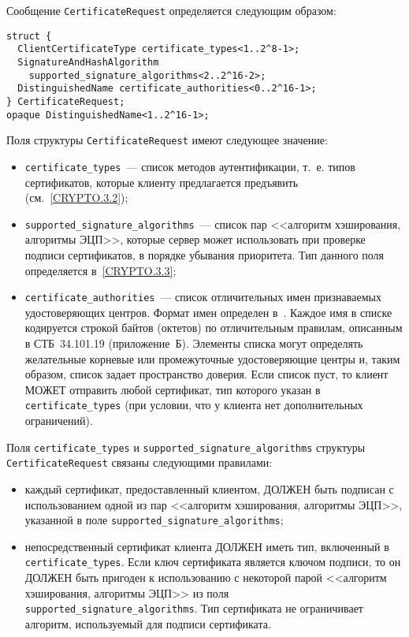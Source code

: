 Сообщение \lstinline{CertificateRequest} определяется следующим образом:
\begin{lstlisting}
struct {
  ClientCertificateType certificate_types<1..2^8-1>;
  SignatureAndHashAlgorithm
    supported_signature_algorithms<2..2^16-2>;
  DistinguishedName certificate_authorities<0..2^16-1>;
} CertificateRequest;
opaque DistinguishedName<1..2^16-1>;
\end{lstlisting}


Поля структуры \lstinline{CertificateRequest} имеют следующее значение:
\begin{itemize}
\item[--]
\lstinline{certificate_types}~--- 
список методов аутентификации, 
т.~е. типов сертификатов, которые клиенту предлагается предъявить 
(см.~\ref{CRYPTO.3.2}); 

\item[--]
\lstinline{supported_signature_algorithms}~--- список пар <<алгоритм 
хэширования, алгоритмы ЭЦП>>, которые сервер может использовать при проверке 
подписи сертификатов, в порядке убывания приоритета. Тип данного поля 
определяется в~\ref{CRYPTO.3.3};  

\item[--]
\lstinline{certificate_authorities}~--- список отличительных имен 
признаваемых удостоверяющих центров. Формат имен определен в~\cite{X501}. 
Каждое имя в списке кодируется строкой байтов (октетов) по отличительным 
правилам, описанным в СТБ~34.101.19 (приложение~Б). 
Элементы списка могут определять желательные корневые или промежуточные 
удостоверяющие центры и, таким образом, список задает пространство 
доверия. Если список пуст, то клиент МОЖЕТ отправить любой сертификат, тип 
которого указан в \lstinline{certificate_types} (при условии, что у 
клиента нет дополнительных ограничений). 
\end{itemize}

Поля \lstinline{certificate_types} и 
\lstinline{supported_signature_algorithms} структуры 
\lstinline{CertificateRequest} связаны следующими правилами: 
\begin{itemize}
\item[--] 
каждый сертификат, предоставленный клиентом, ДОЛЖЕН быть подписан 
с использованием одной из пар <<алгоритм хэширования, алгоритмы ЭЦП>>, 
указанной в поле \lstinline{supported_signature_algorithms}; 

\item[--]
непосредственный сертификат клиента ДОЛЖЕН иметь тип, включенный 
в \lstinline{certificate_types}. Если ключ сертификата является ключом 
подписи, то он ДОЛЖЕН быть пригоден к использованию с некоторой парой 
<<алгоритм хэширования, алгоритмы ЭЦП>> из поля 
\lstinline{supported_signature_algorithms}. Тип сертификата не 
ограничивает алгоритм, используемый для подписи сертификата. 
\end{itemize}

